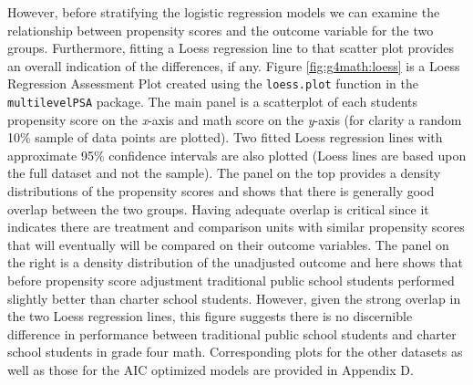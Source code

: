 \documentclass[letterpaper,12p,twoside]{article} %
\begin{document}
However, before stratifying the logistic regression models we can examine the relationship between propensity scores and the outcome variable for the two groups. Furthermore, fitting a Loess regression line to that scatter plot provides an overall indication of the differences, if any. Figure \ref{fig:g4math:loess} is a Loess Regression Assessment Plot created using the \texttt{loess.plot} function in the \texttt{multilevelPSA} package. The main panel is a scatterplot of each students propensity score on the \textit{x}-axis and math score on the \textit{y}-axis (for clarity a random 10\% sample of data points are plotted). Two fitted Loess regression lines with approximate 95\% confidence intervals are also plotted (Loess lines are based upon the full dataset and not the sample). The panel on the top provides a density distributions of the propensity scores and shows that there is generally good overlap between the two groups. Having adequate overlap is critical since it indicates there are treatment and comparison units with similar propensity scores that will eventually will be compared on their outcome variables. The panel on the right is a density distribution of the unadjusted outcome and here shows that before propensity score adjustment traditional public school students performed slightly better than charter school students. However, given the strong overlap in the two Loess regression lines, this figure suggests there is no discernible difference in performance between traditional public school students and charter school students in grade four math. Corresponding plots for the other datasets as well as those for the AIC optimized models are provided in Appendix D.
\end{document}
